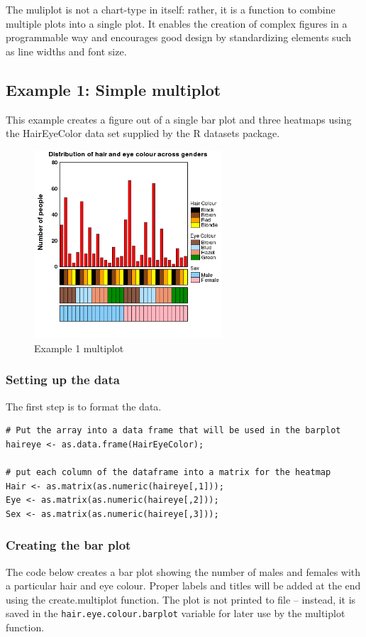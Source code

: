 \documentclass[letterpaper]{article}
\begin{document}
The muliplot is not a chart-type in itself: rather, it is a function to combine multiple plots into a single plot. It enables the creation of complex figures in a programmable way and encourages good design by standardizing elements such as line widths and font size. 

\subsection{Example 1: Simple multiplot}
This example creates a figure out of a single bar plot and three heatmaps using the HairEyeColor data set supplied by the R datasets package.

\begin{figure}[!ht]
  \begin{center}
     \includegraphics[width=70mm]{Figures/Multiplot_Ex1.png}
     \caption{Example 1 multiplot}
     \label{fig:picture}
  \end{center}
\end{figure}

\subsubsection{Setting up the data}
The first step is to format the data. 

\begin{verbatim}
# Put the array into a data frame that will be used in the barplot
haireye <- as.data.frame(HairEyeColor);

# put each column of the dataframe into a matrix for the heatmap
Hair <- as.matrix(as.numeric(haireye[,1]));
Eye <- as.matrix(as.numeric(haireye[,2]));
Sex <- as.matrix(as.numeric(haireye[,3]));
\end{verbatim}

\subsubsection{Creating the bar plot}
The code below creates a bar plot showing the number of males and females with a particular hair and eye colour. Proper labels and titles will be added at the end using the create.multiplot function. The plot is not printed to file -- instead, it is saved in the \verb|hair.eye.colour.barplot| variable for later use by the multiplot function.
\end{document}
